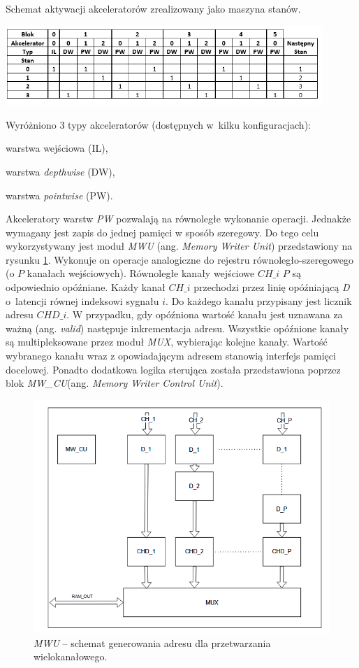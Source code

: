 \begin{table}
    \centering
    \caption{Schemat aktywacji akceleratorów zrealizowany jako maszyna stanów.}
    \label{tab:LNACC}
    \includegraphics[width=0.9\textwidth]{images/acc_activ.png}
\end{table}

Wyróżniono 3 typy akceleratorów (dostępnych w~kilku konfiguracjach):
\begin{description}
\item warstwa wejściowa (IL),
\item warstwa \emph{depthwise} (DW),
\item warstwa \emph{pointwise} (PW).
\end{description}

Akceleratory warstw \emph{PW} pozwalają na równoległe wykonanie operacji.
Jednakże wymagany jest zapis do jednej pamięci w sposób szeregowy.
Do tego celu  wykorzystywany jest moduł \emph{MWU} (ang. \emph{Memory Writer Unit}) przedstawiony na rysunku \ref{fig:mwu}.
Wykonuje on operacje analogiczne do rejestru równoległo-szeregowego (o $P$ kanałach wejściowych).
Równoległe kanały wejściowe $CH\_i$ $P$ są odpowiednio opóźniane. 
Każdy kanał $CH\_{i}$ przechodzi przez linię opóźniającą \emph{D} o~latencji równej indeksowi sygnału $i$.
Do każdego kanału przypisany jest licznik adresu $CHD\_i$.
W przypadku, gdy opóźniona wartość kanału jest uznawana za ważną (ang. \emph{valid}) następuje inkrementacja adresu.
Wszystkie opóźnione kanały są multipleksowane przez moduł \emph{MUX}, wybierając kolejne kanały.
Wartość wybranego kanału wraz z opowiadającym adresem stanowią interfejs pamięci docelowej.
Ponadto dodatkowa logika sterująca została przedstawiona poprzez blok \emph{MW\_CU}(ang. \emph{Memory Writer Control Unit}).
\begin{figure}
    \centering
    \includegraphics[width=0.8\linewidth]{images/MWU.png}
    \caption{\emph{MWU} -- schemat generowania adresu dla przetwarzania wielokanałowego.}
    \label{fig:mwu}
\end{figure}

